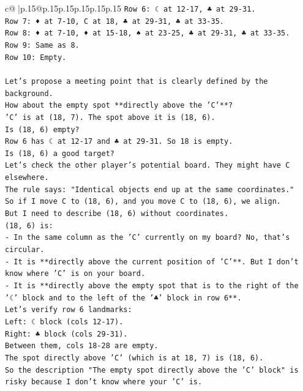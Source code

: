 \documentclass{article}
\begin{document}
{\begin{supertabular}{c@{$\;$}|p{.15\linewidth}@{}p{.15\linewidth}p{.15\linewidth}p{.15\linewidth}p{.15\linewidth}p{.15\linewidth}}
{{{\texttt{Row 6: ☾ at 12{-}17, ♣ at 29{-}31.} \\
\texttt{Row 7: ♦ at 7{-}10, C at 18, ♣ at 29{-}31, ♣ at 33{-}35.} \\
\texttt{Row 8: ♦ at 7{-}10, ♦ at 15{-}18, ♠ at 23{-}25, ♣ at 29{-}31, ♣ at 33{-}35.} \\
\texttt{Row 9: Same as 8.} \\
\texttt{Row 10: Empty.} \\
\\ 
\texttt{Let's propose a meeting point that is clearly defined by the background.} \\
\texttt{How about the empty spot **directly above the 'C'**?} \\
\texttt{'C' is at (18, 7). The spot above it is (18, 6).} \\
\texttt{Is (18, 6) empty?} \\
\texttt{Row 6 has ☾ at 12{-}17 and ♣ at 29{-}31. So 18 is empty.} \\
\texttt{Is (18, 6) a good target?} \\
\texttt{Let's check the other player's potential board. They might have C elsewhere.} \\
\texttt{The rule says: "Identical objects end up at the same coordinates."} \\
\texttt{So if I move C to (18, 6), and you move C to (18, 6), we align.} \\
\texttt{But I need to describe (18, 6) without coordinates.} \\
\texttt{(18, 6) is:} \\
\texttt{{-} In the same column as the 'C' currently on my board? No, that's circular.} \\
\texttt{{-} It is **directly above the current position of 'C'**. But I don't know where 'C' is on your board.} \\
\texttt{{-} It is **directly above the empty spot that is to the right of the '☾' block and to the left of the '♣' block in row 6**.} \\
\texttt{Let's verify row 6 landmarks:} \\
\texttt{Left: ☾ block (cols 12{-}17).} \\
\texttt{Right: ♣ block (cols 29{-}31).} \\
\texttt{Between them, cols 18{-}28 are empty.} \\
\texttt{The spot directly above 'C' (which is at 18, 7) is (18, 6).} \\
\texttt{So the description "The empty spot directly above the 'C' block" is risky because I don't know where your 'C' is.} \\
}}}
\end{supertabular}}
\end{document}
